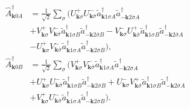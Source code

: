 \documentclass[aps,prb,showpacs,reprint]{revtex4-1}
\begin{document}
\begin{equation}
\begin{split}
\hat{A}^{\dagger}_{\mathbf{k}0
A}&=\frac{1}{\sqrt{2}}\sum_{\sigma}(U^+_{\mathbf{k}\sigma}U^-_{\mathbf{k}
\bar{\sigma} } \tilde { a } ^ { \dagger } _ { \mathbf { k }
1\sigma A}\tilde{a}^{\dagger}_{-\mathbf{k}2\bar{\sigma}
A}\\
&+V^+_{\mathbf{k}\sigma}V^-_{\mathbf{k}\bar{\sigma}}\tilde{a}^{\dagger}_{
\mathbf { k }
1\sigma B}\tilde{a}^{\dagger}_{-\mathbf{k}2\bar{\sigma}
B}-V^-_{\mathbf{k}\sigma}U^+_{\mathbf{k}\bar{\sigma}}\tilde{a}^{\dagger}_{
\mathbf { k }
1\sigma B}\tilde{a}^{\dagger}_{-\mathbf{k}2\bar{\sigma}
A}\\
&-U^+_{\mathbf{k}\sigma}V^-_{\mathbf{k}\bar{\sigma}}\tilde{a}^{\dagger}_{
\mathbf { k }
1\sigma A}\tilde{a}^{\dagger}_{-\mathbf{k}2\bar{\sigma} B}),\\
\hat{A}^{\dagger}_{\mathbf{k}0
B}&=\frac{1}{\sqrt{2}}\sum_{\sigma}(V^+_{\mathbf{k}\sigma}V^-_{\mathbf{k}
\bar{\sigma} } \tilde { a } ^ { \dagger } _ { \mathbf { k }
1\sigma A}\tilde{a}^{\dagger}_{-\mathbf{k}2\bar{\sigma}
A}\\
&+U^+_{\mathbf{k}\sigma}U^-_{\mathbf{k}\bar{\sigma}}\tilde{a}^{\dagger}_{
\mathbf { k }
1\sigma B}\tilde{a}^{\dagger}_{-\mathbf{k}2\bar{\sigma}
B}+U^-_{\mathbf{k}\sigma}V^+_{\mathbf{k}\bar{\sigma}}\tilde{a}^{\dagger}_{
\mathbf { k }
1\sigma B}\tilde{a}^{\dagger}_{-\mathbf{k}2\bar{\sigma}
A}\\
&+V^+_{\mathbf{k}\sigma}U^-_{\mathbf{k}\bar{\sigma}}\tilde{a}^{\dagger}_{
\mathbf { k }
1\sigma A}\tilde{a}^{\dagger}_{-\mathbf{k}2\bar{\sigma} B}).
\end{split}
\end{equation}



\end{document}
